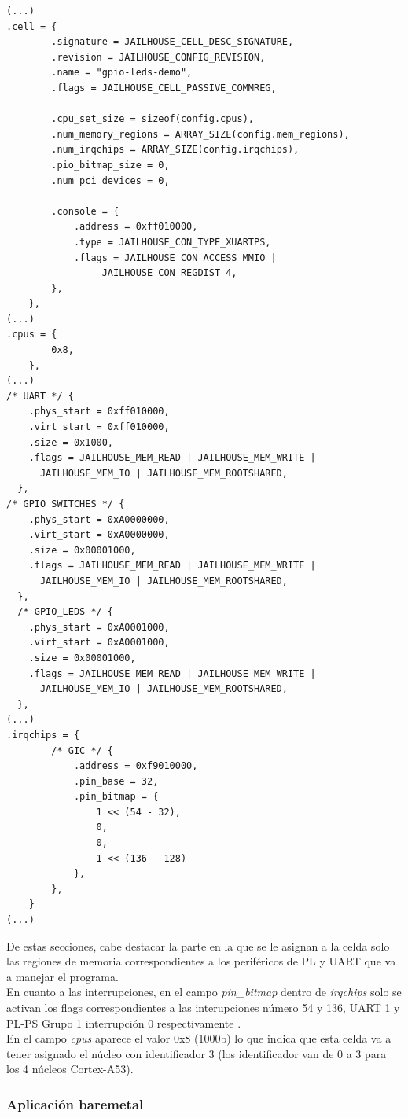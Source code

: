 \begin{lstlisting}[style=CStyle]
(...)
.cell = {
		.signature = JAILHOUSE_CELL_DESC_SIGNATURE,
		.revision = JAILHOUSE_CONFIG_REVISION,
		.name = "gpio-leds-demo",
		.flags = JAILHOUSE_CELL_PASSIVE_COMMREG,

		.cpu_set_size = sizeof(config.cpus),
		.num_memory_regions = ARRAY_SIZE(config.mem_regions),
		.num_irqchips = ARRAY_SIZE(config.irqchips),
		.pio_bitmap_size = 0,
		.num_pci_devices = 0,

		.console = {
			.address = 0xff010000,
			.type = JAILHOUSE_CON_TYPE_XUARTPS,
			.flags = JAILHOUSE_CON_ACCESS_MMIO |
				 JAILHOUSE_CON_REGDIST_4,
		},
	},
(...)
.cpus = {
		0x8,
	},
(...)
/* UART */ {
    .phys_start = 0xff010000,
    .virt_start = 0xff010000,
    .size = 0x1000,
    .flags = JAILHOUSE_MEM_READ | JAILHOUSE_MEM_WRITE |
      JAILHOUSE_MEM_IO | JAILHOUSE_MEM_ROOTSHARED,
  },
/* GPIO_SWITCHES */ {
    .phys_start = 0xA0000000,
    .virt_start = 0xA0000000,
    .size = 0x00001000,
    .flags = JAILHOUSE_MEM_READ | JAILHOUSE_MEM_WRITE |
      JAILHOUSE_MEM_IO | JAILHOUSE_MEM_ROOTSHARED,
  },
  /* GPIO_LEDS */ {
    .phys_start = 0xA0001000,
    .virt_start = 0xA0001000,
    .size = 0x00001000,
    .flags = JAILHOUSE_MEM_READ | JAILHOUSE_MEM_WRITE |
      JAILHOUSE_MEM_IO | JAILHOUSE_MEM_ROOTSHARED,
  },
(...)
.irqchips = {
		/* GIC */ {
			.address = 0xf9010000,
			.pin_base = 32,
			.pin_bitmap = {
				1 << (54 - 32),
				0,
				0,
				1 << (136 - 128)
			},
		},
	}
(...)
\end{lstlisting}

De estas secciones, cabe destacar la parte en la que se le asignan a la celda solo las regiones de memoria correspondientes a los periféricos de \acrshort{PL} y \acrshort{UART} que va a manejar el programa.\\
En cuanto a las interrupciones, en el campo \textit{pin\_bitmap} dentro de \textit{irqchips} solo se activan los flags correspondientes a las interupciones número 54 y 136, \acrshort{UART} 1 y \acrshort{PL}-\acrshort{PS} Grupo 1 interrupción 0 respectivamente \cite{mpsoc_registers}.\\
En el campo \textit{cpus} aparece el valor 0x8 (1000b) lo que indica que esta celda va a tener asignado el núcleo con identificador 3 (los identificador van de 0 a 3 para los 4 núcleos Cortex-A53).

\subsubsection{Aplicación baremetal} \label{app_baremetal}

